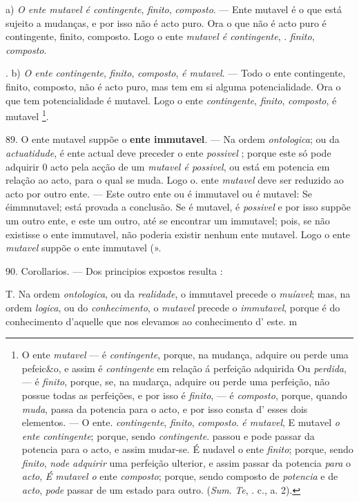 a) \emph{O ente mutavel é contingente}, \emph{finito}, \emph{composto}. --- Ente mutavel é o que está sujeito a mudanças, e por isso não é acto puro. Ora o que não é acto puro é contingente, finito, composto. Logo o ente \emph{mutavel é contingente}, . \emph{finito}, \emph{composto}.

. b) \emph{O ente contingente}, \emph{finito}, \emph{composto}, \emph{é mutavel}. --- Todo o ente contingente, finito, composto, não é acto puro, mas tem em si alguma potencialidade. Ora o que tem potencialidade é mutavel. Logo o ente \emph{contingente}, \emph{finito}, \emph{composto}, é mutavel \footnote{O ente \emph{mutavel} --- é \emph{contingente}, porque, na mudança, adquire ou perde uma pefeic\&o, e assim é \emph{contingente} em relação á perfeição adquirida Ou \emph{perdida}, --- é \emph{finito}, porque, se, na mudarça, adquire ou perde uma perfeição, não possue todas as perfeições, e por isso é \emph{finito}, --- é \emph{composto}, porque, quando \emph{muda}, passa da potencia para o acto, e por isso consta d' esses dois elementos. --- O ente. \emph{contingente}, \emph{finito}, \emph{composto}. \emph{é mutavel}, E mutavel \emph{o ente contingente}; porque, sendo \emph{contingente}. passou e pode passar da potencia para o acto, e assim mudar-se. É nudavel o ente \emph{finito}; porque, sendo \emph{finito}, \emph{node adquirir} uma perfeição ulterior, e assim passar da potencia \emph{para} o \emph{acto}, \emph{É mutavel o} ente \emph{composto}; porque, sendo composto de \emph{potencia} e de \emph{acto}, \emph{pode} passar de um estado para outro. (\emph{Sum}. \emph{Te}, \textbar{}. c., a. 2).}.

89. O ente mutavel suppõe o \textbf{ente immutavel}. --- Na ordem \emph{ontologica}; ou da \emph{actuatidude}, é ente actual deve preceder o ente \emph{possivel} ; porque este só pode adquirir 0 acto pela acção de um  \emph{mutavel é possivel}, ou está em potencia em relação ao acto, para o qual se muda. Logo o. ente \emph{mutavel} deve ser reduzido ao acto por outro ente. --- Este outro ente ou é immutavel ou é mutavel: Se éimmnutavel; está provada a conclusão. Se é mutavel, é \emph{possivel} e por isso suppõe um outro ente, e este um outro, até se encontrar um immutavel; pois, se não existisse o ente immutavel, não poderia existir nenhum ente mutavel. Logo o ente \emph{mutavel} suppõe o ente immutavel (».

90. Corollarios. --- Dos principios expostos resulta :

T. Na ordem \emph{ontologica}, ou da \emph{realidade}, o immutavel precede o \emph{muíavel}; mas, na ordem \emph{logica}, ou do \emph{conhecimento}, o \emph{mutavel} precede o \emph{immutavel}, porque é do conhecimento d'aquelle que nos elevamos ao conhecimento d' este. m

